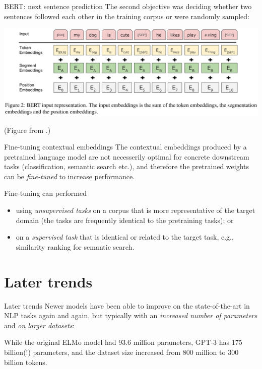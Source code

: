 \documentclass[style=upen, size=14pt]{powerdot}
\newcommand{\gold}{\color{arany}}
\theoremstyle{definition}
\begin{document}
\begin{slide}[toc=]{BERT: next sentence prediction}
  The second objective was deciding whether two sentences followed each other in
  the training corpus or were randomly sampled:\medskip
  
  \begin{centering}
    
    \includegraphics[width=1.\textwidth]{figures/bert2.eps}

    \footnotesize{(Figure from \cite{devlin2018bert}.)}
    
  \end{centering}
\end{slide}


\begin{slide}{Fine-tuning contextual embeddings}
  The contextual embeddings produced by a pretrained language model are not
  necesserily optimal for concrete downstream tasks (classification, semantic
  search etc.), and therefore the pretrained weights can be \emph{\gold fine-tuned} to
  increase performance.

  \bigskip 
  
  Fine-tuning can performed
  \begin{itemize}
  \item using \emph{\gold unsupervised tasks} on a corpus that is more representative of the
    target domain (the tasks are frequently identical to the pretraining tasks); or
  \item on a \emph{\gold supervised task} that is identical or related to the
    target task, e.g., similarity ranking for semantic search.
  \end{itemize}
  
\end{slide}

\section{Later trends}

\begin{slide}[toc=Later trends]{Later trends}
  Newer models have been able to improve on the state-of-the-art in NLP tasks
  again and again, but typically with an \emph{\gold increased number of
    parameters} and \emph{\gold on larger datasets}:\bigskip

  While the original ELMo model had 93.6 million parameters, GPT-3 has 175
  billion(!) parameters, and the dataset size increased from 800 million to 300
  billion tokens.
\end{slide}
\end{document}
